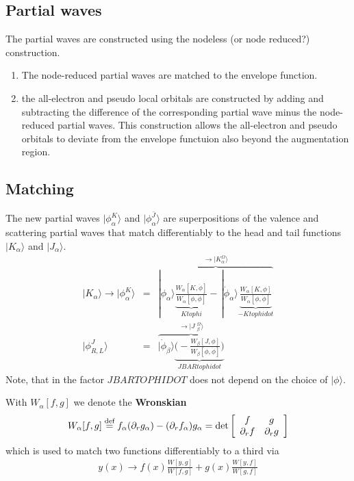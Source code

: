 \documentclass[11pt,a4paper]{report}
\begin{document}
\subsection{Partial waves}
The partial waves are constructed using the nodeless (or node
reduced?) construction. 

\begin{enumerate}
\item The node-reduced partial waves are matched to the envelope
  function.
\item the all-electron and pseudo local orbitals are constructed by
  adding and subtracting the difference of the corresponding partial
  wave minus the node-reduced partial waves. This construction allows
  the all-electron and pseudo orbitals to deviate from the envelope
  functuion also beyond the augmentation region.
\end{enumerate}




\subsection{Matching}
The new partial waves $|\phi^K_\alpha\rangle$ and
$|\phi^{\bar{J}}_\alpha\rangle$ are superpositions of the valence and
scattering partial waves that match differentiably to the head and
tail functions $|K_\alpha\rangle$ and $|J_\alpha\rangle$.
\begin{eqnarray}
|K_\alpha\rangle\rightarrow
|\phi^K_\alpha\rangle&=&
\overbrace{
|\phi_\alpha\rangle 
\underbrace{
\frac{W_\alpha[K,\dot{\phi}]}{W_\alpha[\phi,\dot{\phi}]}}_{Ktophi}
-\,|\dot{\phi}_\alpha\rangle 
\underbrace{\frac{W_\alpha[K,\phi]}{W_\alpha[\phi,\dot{\phi}]}}_{-Ktophidot}
}^{\rightarrow |K^\Omega_\alpha\rangle}
\nonumber\\
|\phi^{J}_{R,L}\rangle
&=&\overbrace{
|\dot{\phi}_\beta\rangle 
\underbrace{\biggl(-\frac{W_\beta[J,\phi]}{W_\beta[\phi,\dot{\phi}]}\biggr)}_{JBARtophidot}
}^{\rightarrow |J\;^\Omega_\beta\rangle}
\end{eqnarray}
Note, that in the factor $JBARTOPHIDOT$ does not depend on the choice
of $|\phi\rangle$.

With $W_\alpha[f,g]$ we denote the \textbf{Wronskian}
\begin{eqnarray}
W_\alpha[f,g]\stackrel{\text{def}}{=} f_\alpha (\partial_r g_\alpha)-(\partial_r f_\alpha)g_\alpha
=\det\left[\begin{array}{cc}f&g\\\partial_rf&\partial_rg\end{array}\right]
\end{eqnarray}
which is used to match two functions differentiably to a third via
\begin{eqnarray}
y(x)\rightarrow f(x)\frac{W[y,g]}{W[f,g]}+g(x)\frac{W[y,f]}{W[g,f]}
\end{eqnarray}
\end{document}
